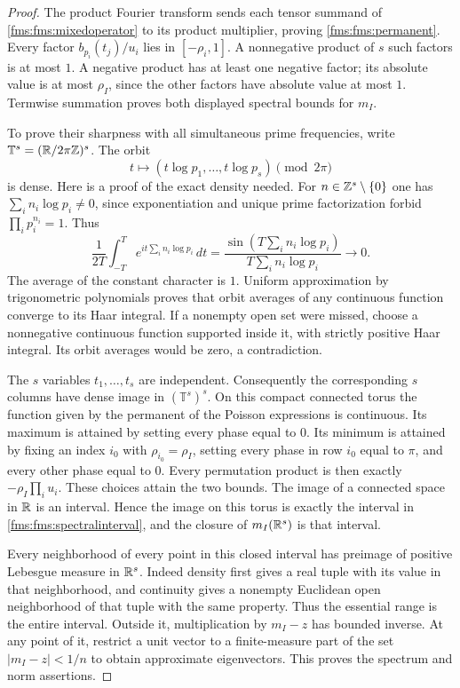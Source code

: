 \begin{proof}
The product Fourier transform sends each tensor summand of
\eqref{fms:fms:mixedoperator} to its product multiplier, proving
\eqref{fms:fms:permanent}.  Every factor
$b_{p_i}(t_j)/u_i$ lies in $[-\rho_i,1]$. A nonnegative product
of $s$ such factors is at most $1$.  A negative product has at
least one negative factor; its absolute value is at most
$\rho_I$, since the other factors have absolute value at most $1$.
Termwise summation proves both displayed spectral bounds for $m_I$.

To prove their sharpness with all simultaneous prime frequencies,
write $\mathbb T^s=(\mathbb R/2\pi\mathbb Z)^s$. The orbit
\[
 t\longmapsto(t\log p_1,\ldots,t\log p_s)\pmod{2\pi}
\]
is dense.  Here is a proof of the exact density needed.
For $n\in\mathbb Z^s\setminus\{0\}$ one has
$\sum_i n_i\log p_i\ne0$, since exponentiation and unique prime
factorization forbid $\prod_i p_i^{n_i}=1$. Thus
\[
 \frac1{2T}\int_{-T}^T e^{it\sum_i n_i\log p_i}\,dt
 =\frac{\sin(T\sum_i n_i\log p_i)}
          {T\sum_i n_i\log p_i}\longrightarrow0.
\]
The average of the constant character is $1$. Uniform approximation
by trigonometric polynomials proves that orbit averages of any
continuous function converge to its Haar integral. If a nonempty
open set were missed, choose a nonnegative continuous function
supported inside it, with strictly positive Haar integral.
Its orbit averages would be zero, a contradiction.

The $s$ variables $t_1,\ldots,t_s$ are independent.  Consequently
the corresponding $s$ columns have dense image in
$(\mathbb T^s)^s$.  On this compact connected torus the function
given by the permanent of the Poisson expressions is continuous.
Its maximum is attained by setting every phase equal to $0$.
Its minimum is attained by fixing an index $i_0$ with
$\rho_{i_0}=\rho_I$, setting every phase in row $i_0$ equal to
$\pi$, and every other phase equal to $0$.
Every permutation product is then exactly
$-\rho_I\prod_i u_i$.  These choices attain the two bounds.
The image of a connected space in $\mathbb R$ is an interval. Hence the
image on this torus is exactly the interval in
\eqref{fms:fms:spectralinterval}, and the closure of $m_I(\mathbb R^s)$ is
that interval.

Every neighborhood of every point in this closed interval has
preimage of positive Lebesgue measure in $\mathbb R^s$. Indeed density
first gives a real tuple with its value in that neighborhood,
and continuity gives a nonempty Euclidean open neighborhood of
that tuple with the same property.  Thus the essential range is
the entire interval. Outside it, multiplication by $m_I-z$ has
bounded inverse. At any point of it, restrict a unit vector to a
finite-measure part of the set $|m_I-z|<1/n$ to obtain approximate
eigenvectors. This proves the spectrum and norm assertions.


\end{proof}
